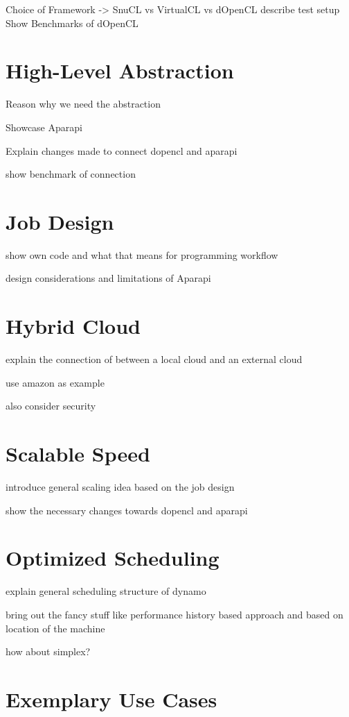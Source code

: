 Choice of Framework -> SnuCL vs VirtualCL vs dOpenCL
describe test setup
Show Benchmarks of dOpenCL

\section{High-Level Abstraction}
\label{abstraction}
Reason why we need the abstraction

Showcase Aparapi

Explain changes made to connect dopencl and aparapi

show benchmark of connection

\section{Job Design}

show own code and what that means for programming workflow

design considerations and limitations of Aparapi

\section{Hybrid Cloud}

explain the connection of between a local cloud and an external cloud

use amazon as example

also consider security

\section{Scalable Speed}

introduce general scaling idea based on the job design

show the necessary changes towards dopencl and aparapi

\section{Optimized Scheduling}

explain general scheduling structure of dynamo

bring out the fancy stuff like performance history based approach and based on location of the machine

how about simplex?

\section{Exemplary Use Cases}

